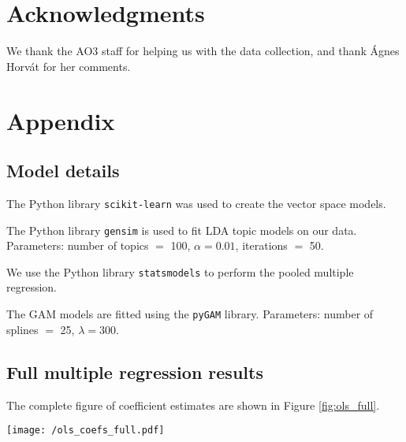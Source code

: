 \documentclass[letterpaper]{article} %
\begin{document}
\section{ Acknowledgments}
We thank the AO3 staff for helping us with the data collection, and thank \' Agnes Horv\' at for her comments.




\appendix
\section{Appendix}
\subsection{Model details}

The Python library \texttt{scikit-learn} was used to create the vector space models. 

The Python library \texttt{gensim} is used to fit LDA topic models on our data. Parameters: number of topics $=$ 100, $\alpha = 0.01$, iterations $=$ 50.

We use the Python library \texttt{statsmodels} \cite{seabold2010statsmodels} to perform the pooled multiple regression.

The GAM models are fitted using the \texttt{pyGAM} library. Parameters: number of splines $=$ 25,  $\lambda = 300$.

\subsection{Full multiple regression results}
The complete figure of coefficient estimates are shown in Figure \ref{fig:ols_full}.

\begin{figure*}
    \centering
          \texttt{[image: /ols\_coefs\_full.pdf]}
        \caption{OLS coefficients for the independent variables and control variables. 95\% confidence intervals are shown. }
        \label{fig:ols_full}
\end{figure*}
\end{document}
